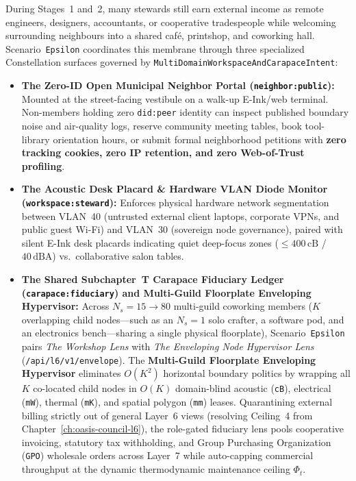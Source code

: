 During Stages~1 and~2, many stewards still earn external income as remote engineers, designers, accountants, or cooperative tradespeople while welcoming surrounding neighbours into a shared caf\'e, printshop, and coworking hall. Scenario~\texttt{Epsilon} coordinates this membrane through three specialized Constellation surfaces governed by \texttt{MultiDomainWorkspaceAndCarapaceIntent}:
\begin{itemize}
    \item \textbf{The Zero-ID Open Municipal Neighbor Portal (\texttt{neighbor:public}):} Mounted at the street-facing vestibule on a walk-up E-Ink/web terminal. Non-members holding zero \texttt{did:peer} identity can inspect published boundary noise and air-quality logs, reserve community meeting tables, book tool-library orientation hours, or submit formal neighborhood petitions with \textbf{zero tracking cookies, zero IP retention, and zero Web-of-Trust profiling}.
    \item \textbf{The Acoustic Desk Placard \& Hardware VLAN Diode Monitor (\texttt{workspace:steward}):} Enforces physical hardware network segmentation between VLAN~40 (untrusted external client laptops, corporate VPNs, and public guest Wi-Fi) and VLAN~30 (sovereign node governance), paired with silent E-Ink desk placards indicating quiet deep-focus zones ($\le 400\,\mathrm{cB}$ / $40\,\mathrm{dBA}$) vs.\ collaborative salon tables.
    \item \textbf{The Shared Subchapter~T Carapace Fiduciary Ledger (\texttt{carapace:fiduciary}) and Multi-Guild Floorplate Enveloping Hypervisor:} Across $N_s = 15 \to 80$ multi-guild coworking members ($K$ overlapping child nodes---such as an $N_s=1$ solo crafter, a software pod, and an electronics bench---sharing a single physical floorplate), Scenario~\texttt{Epsilon} pairs \textit{The Workshop Lens} with \textit{The Enveloping Node Hypervisor Lens} (\texttt{/api/l6/v1/envelope}). The \textbf{Multi-Guild Floorplate Enveloping Hypervisor} eliminates $O(K^2)$ horizontal boundary politics by wrapping all $K$ co-located child nodes in $O(K)$ domain-blind acoustic (\texttt{cB}), electrical (\texttt{mW}), thermal (\texttt{mK}), and spatial polygon (\texttt{mm}) leases. Quarantining external billing strictly out of general Layer~6 views (resolving Ceiling~4 from Chapter~\ref{ch:oasis-council-l6}), the role-gated fiduciary lens pools cooperative invoicing, statutory tax withholding, and Group Purchasing Organization (\texttt{GPO}) wholesale orders across Layer~7 while auto-capping commercial throughput at the dynamic thermodynamic maintenance ceiling $\Phi_t$.
\end{itemize}

